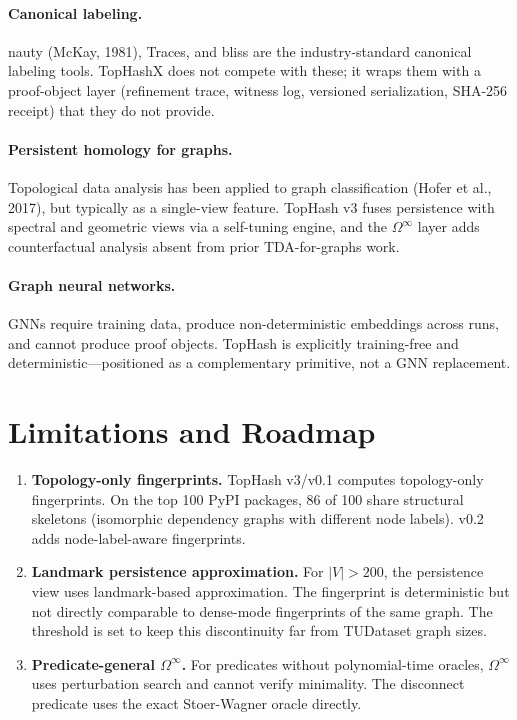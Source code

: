\documentclass[11pt]{article}
\begin{document}
\paragraph{Canonical labeling.} nauty (McKay, 1981), Traces, and bliss are the industry-standard canonical labeling tools. TopHashX does not compete with these; it wraps them with a proof-object layer (refinement trace, witness log, versioned serialization, SHA-256 receipt) that they do not provide.

\paragraph{Persistent homology for graphs.} Topological data analysis has been applied to graph classification (Hofer et al., 2017), but typically as a single-view feature. TopHash v3 fuses persistence with spectral and geometric views via a self-tuning engine, and the $\Omega^\infty$ layer adds counterfactual analysis absent from prior TDA-for-graphs work.

\paragraph{Graph neural networks.} GNNs require training data, produce non-deterministic embeddings across runs, and cannot produce proof objects. TopHash is explicitly training-free and deterministic---positioned as a complementary primitive, not a GNN replacement.

\section{Limitations and Roadmap}

\begin{enumerate}
    \item \textbf{Topology-only fingerprints.} TopHash v3/v0.1 computes topology-only fingerprints. On the top 100 PyPI packages, 86 of 100 share structural skeletons (isomorphic dependency graphs with different node labels). v0.2 adds node-label-aware fingerprints.
    \item \textbf{Landmark persistence approximation.} For $|V| > 200$, the persistence view uses landmark-based approximation. The fingerprint is deterministic but not directly comparable to dense-mode fingerprints of the same graph. The threshold is set to keep this discontinuity far from TUDataset graph sizes.
    \item \textbf{Predicate-general $\Omega^\infty$.} For predicates without polynomial-time oracles, $\Omega^\infty$ uses perturbation search and cannot verify minimality. The disconnect predicate uses the exact Stoer-Wagner oracle directly.
\end{enumerate}
\end{document}
